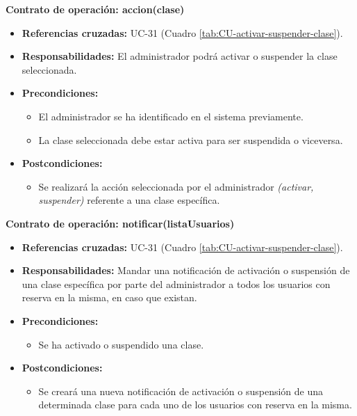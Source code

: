 \textbf{Contrato de operación: accion(clase)}
\begin{itemize}
\item \textbf{Referencias cruzadas:} UC-31 (Cuadro \ref{tab:CU-activar-suspender-clase}).
\item \textbf{Responsabilidades:} El administrador podrá activar o suspender la clase seleccionada.
\item \textbf{Precondiciones:} 
 \begin{itemize}
\item El administrador se ha identificado en el sistema previamente.
\item La clase seleccionada debe estar activa para ser suspendida o viceversa.
\end {itemize}
\item \textbf{Postcondiciones:} 
 \begin{itemize}
\item Se realizará la acción seleccionada por el administrador \textit{(activar, suspender)} referente a una clase específica.
\end {itemize}
\end {itemize}

\textbf{Contrato de operación: notificar(listaUsuarios)}
\begin{itemize}
\item \textbf{Referencias cruzadas:} UC-31 (Cuadro \ref{tab:CU-activar-suspender-clase}).
\item \textbf{Responsabilidades:} Mandar una notificación de activación o suspensión de una clase específica por parte del administrador a todos los usuarios con reserva en la misma, en caso que existan.
\item \textbf{Precondiciones:} 
 \begin{itemize}
\item Se ha activado o suspendido una clase.
\end {itemize}
\item \textbf{Postcondiciones:} 
 \begin{itemize}
\item Se creará una nueva notificación de activación o suspensión de una determinada clase para cada uno de los usuarios con reserva en la misma.
\end {itemize}
\end {itemize}

